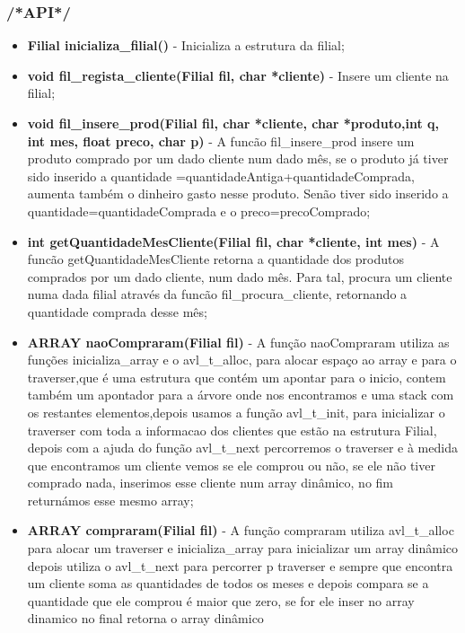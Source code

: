 \subsubsection{/*API*/}

\begin{itemize}
\item	\textbf{Filial inicializa\_filial()} - Inicializa a estrutura da filial; 

\item	\textbf{void fil\_regista\_cliente(Filial fil, char *cliente)} - Insere um cliente na filial; 

\item 	\textbf{void fil\_insere\_prod(Filial fil, char *cliente, char *produto,int q, int mes, float preco, char p)} - A funcão fil\_insere\_prod insere  um produto comprado por um dado cliente num dado mês, se o produto já tiver sido inserido a quantidade =quantidadeAntiga+quantidadeComprada, aumenta também o dinheiro gasto nesse produto. Senão tiver sido inserido a quantidade=quantidadeComprada e o 
preco=precoComprado; 
 
\item	\textbf{int getQuantidadeMesCliente(Filial fil, char *cliente, int mes)} - A funcão getQuantidadeMesCliente retorna a quantidade dos produtos comprados por um dado cliente, num dado mês. Para tal, procura um cliente numa dada filial através da funcão fil\_procura\_cliente, retornando a quantidade comprada  desse mês; 

\item	\textbf{ARRAY naoCompraram(Filial fil)} - A função naoCompraram  utiliza as funções inicializa\_array e o avl\_t\_alloc, para alocar espaço ao array e para o 
traverser,que é uma estrutura que contém um apontar para o inicio, contem também um apontador para a árvore onde nos 
encontramos e uma stack com os restantes elementos,depois usamos a função avl\_t\_init, para inicializar o traverser
com toda a informacao dos clientes que estão na estrutura Filial, depois com a ajuda do função avl\_t\_next percorremos
o traverser e à medida que encontramos um cliente vemos se ele comprou ou não, se ele não tiver comprado nada,
inserimos esse cliente num array dinâmico, no fim returnámos esse mesmo array; 

\item	\textbf{ARRAY compraram(Filial fil)} - A função compraram utiliza avl\_t\_alloc para alocar um traverser e inicializa\_array para inicializar um array dinâmico 
depois utiliza o avl\_t\_next para percorrer p traverser e sempre que encontra um cliente soma as quantidades de todos os meses e depois compara se a quantidade que ele comprou é maior que zero, se for ele inser no array dinamico no final retorna o array dinâmico



\end{itemize}

